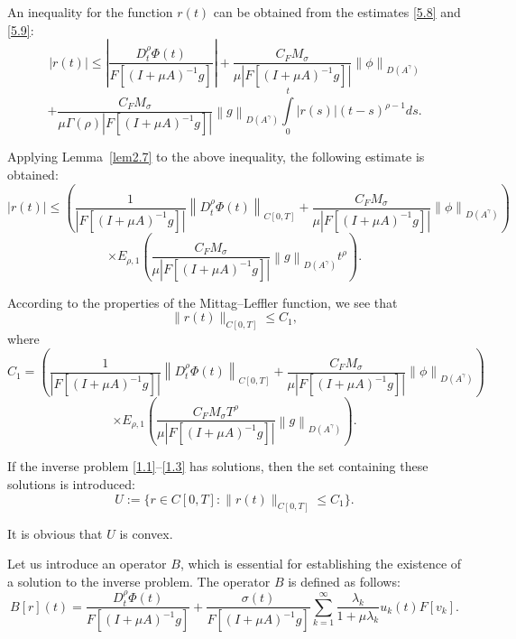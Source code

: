 \documentclass[reqno]{amsart}
\theoremstyle{definition}
\numberwithin{equation}{section}
\begin{document}
An inequality for the function $r(t)$ can be obtained from the estimates \eqref{5.8} and \eqref{5.9}:
$$
\left| r(t) \right| \le\left| \frac{D_{t}^{\rho }\Phi (t)}{F[{{(I+\mu A)}^{-1}}g]} \right|+\frac{{{C}_{F}}{{M}_{\sigma }}}{\mu \left| F[{{(I+\mu A)}^{-1}}g] \right|}{{\left\| \phi  \right\|}_{D(A^{\gamma })}}
$$
$$
+\frac{{{C}_{F}}{{M}_{\sigma }}}{\mu \Gamma (\rho )\left| F[{{(I+\mu A)}^{-1}}g] \right|}{{\left\| g \right\|}_{D(A^{\gamma })}}\int\limits_{0}^{t}{|r(s)|{{(t-s)}^{\rho -1}}ds}.
$$

Applying Lemma~\ref{lem2.7} to the above inequality, the following estimate is obtained:
$$
\left| r(t) \right|\le \left( \frac{1}{\left| F[{{(I+\mu A)}^{-1}}g] \right|}{{\left\| D_{t}^{\rho }\Phi (t) \right\|}_{C[0,T]}}+\frac{{{C}_{F}}{{M}_{\sigma }}}{\mu \left| F[{{(I+\mu A)}^{-1}}g] \right|}{{\left\| \phi  \right\|}_{D(A^{\gamma })}} \right)
$$
$$
\times {{E}_{\rho ,1}}\left( \frac{{{C}_{F}}{{M}_{\sigma }}}{\mu \left| F[{{(I+\mu A)}^{-1}}g] \right|}{{\left\| g \right\|}_{D(A^{\gamma })}}{{t}^{\rho }} \right).
$$

According to the properties of the Mittag–Leffler function, we see that
\begin{equation}\label{5.10}
    \|r(t)\|_{C[0,T]} \leq C_1,
\end{equation}
where
$$
C_1=\left( \frac{1}{\left| F[{{(I+\mu A)}^{-1}}g] \right|}{{\left\| D_{t}^{\rho }\Phi (t) \right\|}_{C[0,T]}}+\frac{{{C}_{F}}{{M}_{\sigma }}}{\mu \left| F[{{(I+\mu A)}^{-1}}g] \right|}{{\left\| \phi  \right\|}_{D(A^{\gamma })}} \right)
$$
$$
\times {{E}_{\rho ,1}}\left( \frac{{{C}_{F}}{{M}_{\sigma }}{{T}^{\rho }}}{\mu \left| F[{{(I+\mu A)}^{-1}}g] \right|}{{\left\| g \right\|}_{D(A^{\gamma })}} \right).
$$

If the inverse problem \eqref{1.1}–\eqref{1.3} has solutions, then the set containing these solutions is introduced:
$$
U := \{ r \in C[0,T] : \|r(t)\|_{C[0,T]} \leq C_1 \}.
$$

It is obvious that $U$ is convex.


Let us introduce an operator $B$, which is essential for establishing the existence of a solution to the inverse problem. The operator $B$ is defined as follows:
\begin{equation}\label{5.11}
B[r](t)=\frac{D_{t}^{\rho }\Phi(t)}{F[{{(I+\mu A)}^{-1}}g]}+\frac{\sigma (t)}{F[{{(I+\mu A)}^{-1}}g]}\sum\limits_{k=1}^{\infty }{\frac{{{\lambda }_{k}}}{1+\mu {{\lambda }_{k}}}{{u}_{k}}(t)F\left[ {{v}_{k}} \right]}.
\end{equation}
\end{document}
